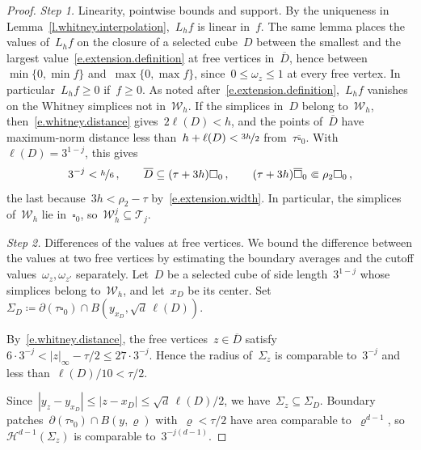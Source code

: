 \documentclass[11pt,letterpaper]{article}
\numberwithin{equation}{section}
\theoremstyle{definition}
\newcommand{\nf}{\nicefrac}
\newcommand{\cu}{\square}
\renewcommand{\subset}{\subseteq}
\begin{document}
\begin{proof}
\emph{Step 1.} Linearity, pointwise bounds and support. By the uniqueness in Lemma~\ref{l.whitney.interpolation},~$L_hf$ is linear in~$f$. The same lemma places the values of~$L_hf$ on the closure of a selected cube~$D$ between the smallest and the largest value~\eqref{e.extension.definition} at free vertices in~$\overline D$, hence between~$\min\{0,\min f\}$ and~$\max\{0,\max f\}$, since~$0\leq\omega_z\leq1$ at every free vertex. In particular~$L_hf\geq0$ if~$f\geq0$. As noted after~\eqref{e.extension.definition},~$L_hf$ vanishes on the Whitney simplices not in~$\mathscr W_h$. If the simplices in~$D$ belong to~$\mathscr W_h$, then~\eqref{e.whitney.distance} gives~$2\ell(D)<h$, and the points of~$\overline D$ have maximum-norm distance less than~$h+\ell(D)<\nf{3h}2$ from~$\tau\overline{\cu}_0$. With~$\ell(D)=3^{1-j}$, this gives
\begin{equation}
	3^{-j}<\nf h6\,,\qquad \overline D\subset(\tau+3h)\cu_0\,,\qquad (\tau+3h)\overline{\cu}_0\Subset\rho_2\cu_0\,,
	\label{e.extension.support}
\end{equation}
the last because~$3h<\rho_2-\tau$ by~\eqref{e.extension.width}. In particular, the simplices of~$\mathscr W_h$ lie in~$\cu_0$, so~$\mathscr W_h^j\subset\mathscr T_j$.

\smallskip

\emph{Step 2.} Differences of the values at free vertices. We bound the difference between the values at two free vertices by estimating the boundary averages and the cutoff values~$\omega_z,\omega_{z'}$ separately. Let~$D$ be a selected cube of side length~$3^{1-j}$ whose simplices belong to~$\mathscr W_h$, and let~$x_D$ be its center. Set~$\Sigma_D\coloneqq\partial(\tau\cu_0)\cap B(y_{x_D},\sqrt d\,\ell(D))$.

By~\eqref{e.whitney.distance}, the free vertices~$z\in\overline D$ satisfy~$6\cdot3^{-j}<|z|_\infty-\tau/2\leq27\cdot3^{-j}$. Hence the radius of~$\Sigma_z$ is comparable to~$3^{-j}$ and less than~$\ell(D)/10<\tau/2$.

Since~$|y_z-y_{x_D}|\leq|z-x_D|\leq\sqrt d\,\ell(D)/2$, we have~$\Sigma_z\subset\Sigma_D$. Boundary patches~$\partial(\tau\cu_0)\cap B(y,\varrho)$ with~$\varrho<\tau/2$ have area comparable to~$\varrho^{d-1}$, so~$\mathcal H^{d-1}(\Sigma_z)$ is comparable to~$3^{-j(d-1)}$.


\end{proof}
\end{document}
